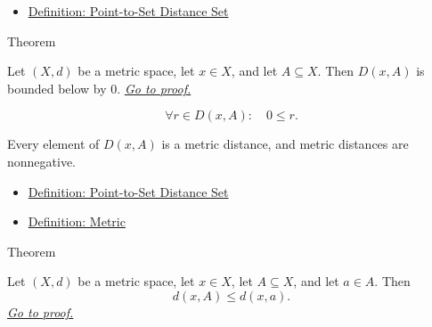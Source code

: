 \begin{dependencies}
\begin{itemize}
  \item \hyperref[def:metric-point-set-distance-set]{Definition: Point-to-Set Distance Set}
\end{itemize}
\end{dependencies}

\begin{theorembox}{Theorem}
\begin{theorem}
\label{thm:metric-distance-set-bounded-below}
Let \((X,d)\) be a metric space, let \(x\in X\), and let \(A\subseteq X\).
Then \(D(x,A)\) is bounded below by \(0\).
\hyperref[prf:metric-distance-set-bounded-below]{\textit{Go to proof.}}
\end{theorem}
\end{theorembox}

\begin{remark*}
\[
\forall r\in D(x,A){:}\quad 0\leq r.
\]
\end{remark*}

\begin{remark*}[Interpretation]
Every element of \(D(x,A)\) is a metric distance, and metric distances are
nonnegative.
\end{remark*}


\begin{dependencies}
\begin{itemize}
  \item \hyperref[def:metric-point-set-distance-set]{Definition: Point-to-Set Distance Set}
  \item \hyperref[def:metric-on-set]{Definition: Metric}
\end{itemize}
\end{dependencies}

\begin{theorembox}{Theorem}
\begin{theorem}
\label{thm:metric-distance-to-set-le-distance-to-point-of-mem}
Let \((X,d)\) be a metric space, let \(x\in X\), let \(A\subseteq X\), and let
\(a\in A\).  Then
\[
  d(x,A)\leq d(x,a).
\]
\hyperref[prf:metric-distance-to-set-le-distance-to-point-of-mem]{\textit{Go to proof.}}
\end{theorem}
\end{theorembox}

